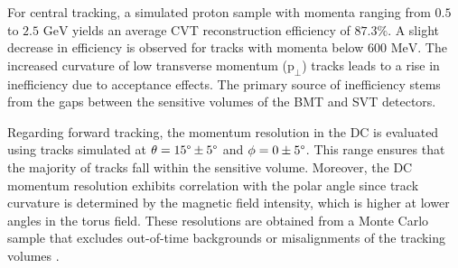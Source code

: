     For central tracking, a simulated proton sample with momenta ranging from $0.5$ to $2.5 \text{ GeV}$ yields an average CVT reconstruction efficiency of $87.3\%$.
    A slight decrease in efficiency is observed for tracks with momenta below $600 \text{ MeV}$.
    The increased curvature of low transverse momentum ($\text{p}_\perp$) tracks leads to a rise in inefficiency due to acceptance effects.
    The primary source of inefficiency stems from the gaps between the sensitive volumes of the BMT and SVT detectors.

    Regarding forward tracking, the momentum resolution in the DC is evaluated using tracks simulated at $\theta = 15\degree \pm 5\degree$ and $\phi = 0 \pm 5\degree$.
    This range ensures that the majority of tracks fall within the sensitive volume.
    Moreover, the DC momentum resolution exhibits correlation with the polar angle since track curvature is determined by the magnetic field intensity, which is higher at lower angles in the torus field.
    These resolutions are obtained from a Monte Carlo sample that excludes out-of-time backgrounds or misalignments of the tracking volumes \cite{ziegler2020}.

